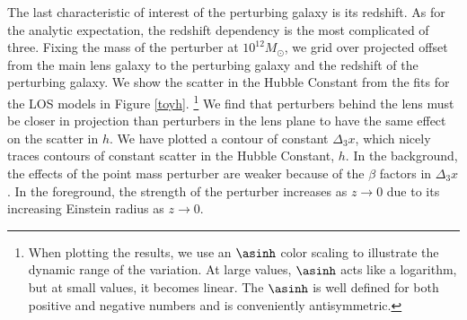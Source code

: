 The last characteristic of interest of the perturbing galaxy is its redshift. As for the analytic expectation, the redshift dependency is the most complicated of three. Fixing the mass of the perturber at $10^{12} M_\odot$, we grid over projected offset from the main lens galaxy to the perturbing galaxy and the redshift of the perturbing galaxy. We show the scatter in the Hubble Constant from the fits for the LOS models in Figure \ref{toyh}. \footnote{When plotting the results, we use an $\asinh$ color scaling to illustrate the dynamic range of the variation. At large values, $\asinh$ acts like a logarithm, but at small values, it becomes linear. The $\asinh$ is well defined for both positive and negative numbers and is conveniently antisymmetric.} We find that perturbers behind the lens must be closer in projection than perturbers in the lens plane to have the same effect on the scatter in $h$. We have plotted a contour of constant $\Delta_3 x$, which nicely traces contours of constant scatter in the Hubble Constant, $h$. In the background, the effects of the point mass perturber are weaker because of the $\beta$ factors in $\Delta_3 x$. In the foreground, the strength of the perturber increases as $z \rightarrow 0$ due to its increasing Einstein radius as $z \rightarrow 0$.